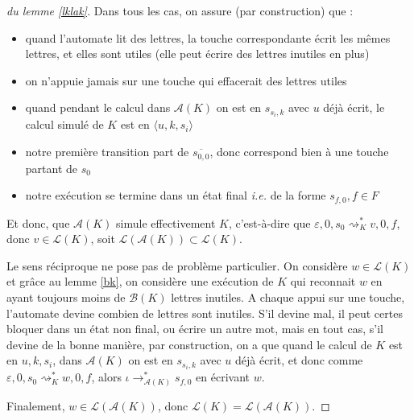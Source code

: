 \documentclass[12pt, a4paper]{article}
\renewcommand{\L}{\mathcal{L}}
\newcommand{\A}{\mathcal{A}}
\begin{document}
\begin{proof}[du lemme \ref{lklak}]
       Dans tous les cas, on assure (par construction) que :
       \begin{itemize}
        \item quand l'automate lit des lettres, la touche correspondante écrit les mêmes lettres, et elles sont utiles (elle peut écrire des lettres inutiles en plus)
        \item on n'appuie jamais sur une touche qui effacerait des lettres utiles 
        \item quand pendant le calcul dans $\A(K)$ on est en $s_{s_i,k}$ avec $u$ déjà écrit, le calcul simulé de $K$ est en $\langle u,k,s_i\rangle$
        \item notre première transition part de $\overline{s_{0,0}}$, donc correspond bien à une touche partant de $s_0$ 
        \item notre exécution se termine dans un état final \textit{i.e.} de la forme $s_{f,0}, f \in F$
       \end{itemize} 
       Et donc, que $\A(K)$ simule effectivement $K$, c'est-à-dire que $\varepsilon,0,s_0 \rightsquigarrow^*_K v,0,f$, donc $v \in \L(K)$, soit $\L(\A(K)) \subset \L(K)$.

       Le sens réciproque ne pose pas de problème particulier. On considère $w \in \L(K)$ et grâce au lemme \ref{bk}, on considère une exécution de $K$ qui reconnait $w$ en ayant toujours moins de $\mathcal{B}(K)$ lettres inutiles.
       A chaque appui sur une touche, l'automate devine combien de lettres sont inutiles. 
       S'il devine mal, il peut certes bloquer dans un état non final, ou écrire un autre mot, mais en tout cas, s'il devine de la bonne manière, par construction, on a que quand le calcul de $K$ est en $u,k,s_i$, dans $\A(K)$ on est en $s_{s_i,k}$ avec $u$ déjà écrit, et donc comme $\varepsilon,0,s_0 \rightsquigarrow^*_K w,0,f$, alors $\iota \rightarrow^*_{\A(K)} s_{f,0}$ en écrivant $w$. 
       
       Finalement, $w \in \L(\A(K))$, donc $\L(K) = \L(\A(K))$.
    \end{proof}
\end{document}
